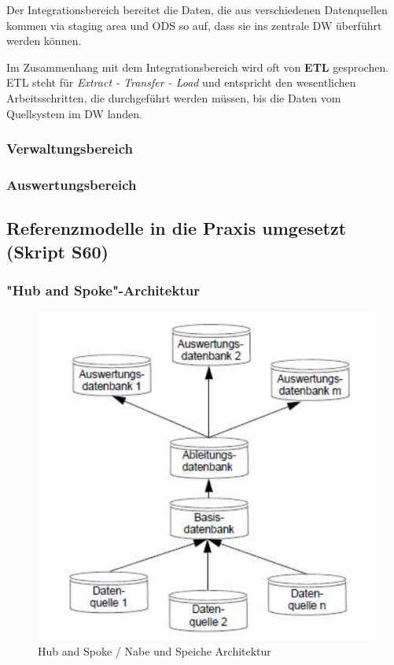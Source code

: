 \documentclass[a4paper, 11pt]{article}
\begin{document}
Der Integrationsbereich bereitet die Daten, die aus verschiedenen Datenquellen kommen via staging area und ODS so auf, dass sie ins zentrale DW überführt werden können. 

Im Zusammenhang mit dem Integrationsbereich wird oft von \textbf{ETL} gesprochen. ETL steht für \textit{Extract - Transfer - Load} und entspricht den wesentlichen Arbeitsschritten, die durchgeführt werden müssen, bis die Daten vom Quellsystem im DW landen.

\subsubsection{Verwaltungsbereich}
\subsubsection{Auswertungsbereich}
\newpage

\subsection{Referenzmodelle in die Praxis umgesetzt (Skript S60)}
\subsubsection{"Hub and Spoke"-Architektur}
\begin{figure}
	\centering
	\includegraphics[keepaspectratio=true,height=16\baselineskip]{HubAndSpoke.PNG}
	\caption{Hub and Spoke / Nabe und Speiche Architektur}
	\label{label}
\end{figure}
\end{document}
